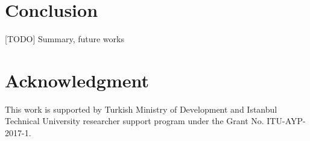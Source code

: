 \documentclass[conference]{IEEEtran}
\begin{document}
\section{Conclusion} \label{Conclusion}
[TODO] Summary, future works
\cite{7815384} \cite{7803607} \cite{7996384} \cite{8090518} \cite{s17061193} \cite{8267219} \cite{8430542} \cite{8319183} \cite{8480649} \cite{AN1200.22} \cite{Bor:2016:LLW:2988287.2989163} \cite{8406255} \cite{DBLP:journals/corr/abs-1802-10338} \cite{finnegan2018comparative}


\section*{Acknowledgment}
This work is supported by Turkish Ministry of Development and Istanbul Technical University researcher support program under the Grant No. ITU-AYP-2017-1.




\end{document}
